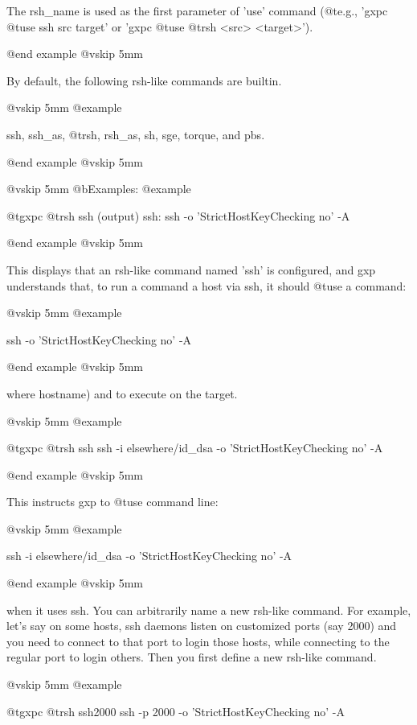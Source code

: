   The rsh_name is used as the first parameter of 'use' command (@t{e}.g.,
  'gxpc @t{use} ssh src target' or 'gxpc @t{use} @t{rsh} <src> <target>').

@end example
@vskip 5mm

  By default, the following rsh-like commands are builtin.

@vskip 5mm
@example

  ssh, ssh_as, @t{rsh}, rsh_as, sh, sge, torque, and pbs.

@end example
@vskip 5mm

@vskip 5mm
@b{Examples:}
@example

  @t{gxpc} @t{rsh} ssh
  (output) ssh: ssh -o 'StrictHostKeyChecking no' -A %

@end example
@vskip 5mm

  This displays that an rsh-like command named 'ssh' is configured,
  and gxp understands that, to run a command a host via ssh, it should
  @t{use} a command:

@vskip 5mm
@example

         ssh -o 'StrictHostKeyChecking no' -A %

@end example
@vskip 5mm

  where %
  hostname) and %
  to execute on the target.
     
@vskip 5mm
@example

  @t{gxpc} @t{rsh} ssh ssh -i elsewhere/id_dsa -o 'StrictHostKeyChecking no' -A %

@end example
@vskip 5mm

  This instructs gxp to @t{use} command line:

@vskip 5mm
@example

     ssh -i elsewhere/id_dsa -o 'StrictHostKeyChecking no' -A %

@end example
@vskip 5mm

  when it uses ssh.  You can arbitrarily name a new rsh-like command. For example,
  let's say on some hosts, ssh daemons listen on customized ports (say 2000) and
  you need to connect to that port to login those hosts, while connecting to the
  regular port to login others. Then you first define a new rsh-like command.
  
@vskip 5mm
@example

  @t{gxpc} @t{rsh} ssh2000 ssh -p 2000 -o 'StrictHostKeyChecking no' -A %

